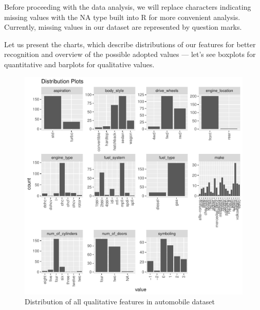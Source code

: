 \documentclass[11pt,a4paper]{article}\usepackage[]{graphicx}\usepackage[]{xcolor}
\makeatletter
\def\maxwidth{ %
  \ifdim\Gin@nat@width>\linewidth
    \linewidth
  \else
    \Gin@nat@width
  \fi
}
\newenvironment{knitrout}{}{} %
\makeatother
\begin{document}
	

	

	

	


Before proceeding with the data analysis, we will replace characters indicating missing values with the NA type built into R for more convenient analysis. Currently, missing values in our dataset are represented by question marks.

	

	Let us present the charts, which describe distributions of our features for better recognition and overview of the possible adopted values --- let's see boxplots for quantitative and barplots for qualitative values.

	
\begin{knitrout}
\color{fgcolor}\begin{figure}
\includegraphics[width=\maxwidth]{figure/barplots_categorical_features-1} \caption[Distribution of all qualitative features in automobile dataset]{Distribution of all qualitative features in automobile dataset}\label{fig:barplots_categorical_features}
\end{figure}

\end{knitrout}
	
\end{document}
